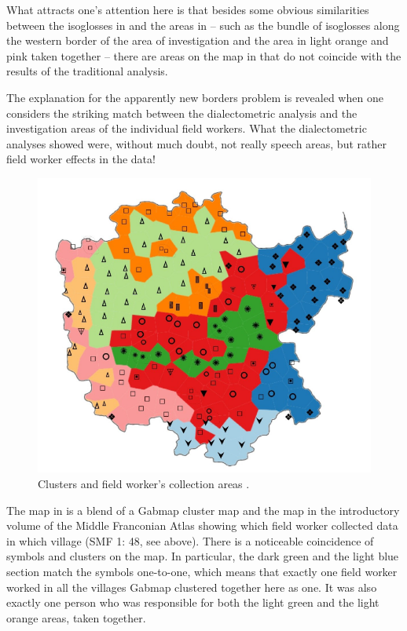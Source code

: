 \documentclass[output=paper]{LSP/langsci}
\begin{document}
What attracts one's attention here is that besides some obvious similarities between the isoglosses in  and the areas in  – such as the bundle of isoglosses along the western border of the area of investigation and the area in light orange and pink taken together – there are areas on the map in  that do not coincide with the results of the traditional analysis.

The explanation for the apparently new borders problem is revealed when one considers the striking match between the dialectometric analysis and the investigation areas of the individual field workers. What the dialectometric analyses showed were, without much doubt, not really speech areas, but rather field worker effects in the data!

\begin{figure}
\includegraphics[width=.7\textwidth]{illustrations/mathus_fig8}
\caption{Clusters and field worker's collection areas \citep[216]{mathussek_sprachraume_2014}.}
\label{fig:mathus:8}
\end{figure}

The map in  is a blend of a Gabmap cluster map and the map in the introductory volume of the Middle Franconian Atlas showing which field worker collected data in which village (SMF 1: 48, see  above). There is a noticeable coincidence  of symbols and clusters on the map. In particular, the dark green and the light blue section match the symbols one-to-one, which means that exactly one field worker worked in all the villages Gabmap clustered together here as one. It was also exactly one person who was responsible for both the light green and the light orange areas, taken together.
\end{document}
